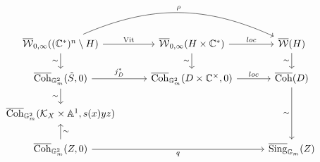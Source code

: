 \[
\begin{tikzcd}[column sep=2.8em, row sep=1.6em]
\overline{\cW}_{0,\infty}((\C^*)^n\setminus H) \arrow[r, "\mathrm{Vit}"] \arrow[rr, bend left=24, "\rho"] \arrow[d, "{\sim}"'] & \overline{\cW}_{0,\infty}(H\times\C^*) \arrow[r, "loc"] \arrow[d, "{\sim}"'] & \overline{\cW}(H) \arrow[d, "{\sim}"'] \\
\overline{\operatorname{Coh}}_{\mathbb G_m^2}(\tilde S,0) \arrow[r, "j_{\tilde D}^*"] \arrow[d, "{\sim}"'] & \overline{\operatorname{Coh}}_{\mathbb G_m^2}(D\times\C^\times,0) \arrow[r, "loc"] & \overline{\operatorname{Coh}}(D) \arrow[dd, "{\sim}"'] \\
\overline{\operatorname{Coh}}_{\mathbb G_m^2}(\cK_X\times\mathbb A^1,s(x)yz) & & \\
\overline{\operatorname{Coh}}_{\mathbb G_m^2}(Z,0) \arrow[u, "{\sim}"'] \arrow[rr, "q"'] & & \overline{\operatorname{Sing}}_{\mathbb G_m}(Z)
\end{tikzcd}
\]
